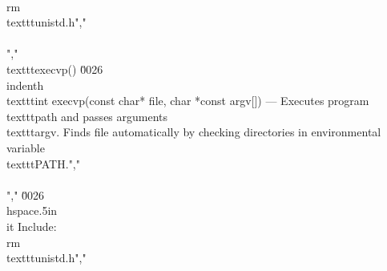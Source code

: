  \\rm\\texttt{unistd.h}","        \\\\","    \\texttt{execvp()} \u0026 \\indenth\\texttt{int execvp(const char* file, char *const argv[])} --- Executes program \\texttt{path} and passes arguments \\texttt{argv}. Finds file automatically by checking directories in environmental variable \\texttt{PATH}.","        \\\\","    \u0026 \\hspace{.5in}\\it Include: \\rm\\texttt{unistd.h}","    %